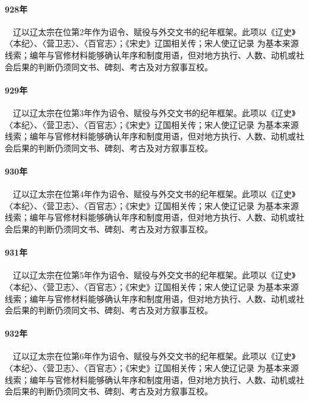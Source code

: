 \paragraph{928年}　辽以辽太宗在位第2年作为诏令、赋役与外交文书的纪年框架。此项以《辽史》〈本纪〉、〈营卫志〉、〈百官志〉；《宋史》辽国相关传；宋人使辽记录 为基本来源线索；编年与官修材料能够确认年序和制度用语，但对地方执行、人数、动机或社会后果的判断仍须同文书、碑刻、考古及对方叙事互校。

\paragraph{929年}　辽以辽太宗在位第3年作为诏令、赋役与外交文书的纪年框架。此项以《辽史》〈本纪〉、〈营卫志〉、〈百官志〉；《宋史》辽国相关传；宋人使辽记录 为基本来源线索；编年与官修材料能够确认年序和制度用语，但对地方执行、人数、动机或社会后果的判断仍须同文书、碑刻、考古及对方叙事互校。

\paragraph{930年}　辽以辽太宗在位第4年作为诏令、赋役与外交文书的纪年框架。此项以《辽史》〈本纪〉、〈营卫志〉、〈百官志〉；《宋史》辽国相关传；宋人使辽记录 为基本来源线索；编年与官修材料能够确认年序和制度用语，但对地方执行、人数、动机或社会后果的判断仍须同文书、碑刻、考古及对方叙事互校。

\paragraph{931年}　辽以辽太宗在位第5年作为诏令、赋役与外交文书的纪年框架。此项以《辽史》〈本纪〉、〈营卫志〉、〈百官志〉；《宋史》辽国相关传；宋人使辽记录 为基本来源线索；编年与官修材料能够确认年序和制度用语，但对地方执行、人数、动机或社会后果的判断仍须同文书、碑刻、考古及对方叙事互校。

\paragraph{932年}　辽以辽太宗在位第6年作为诏令、赋役与外交文书的纪年框架。此项以《辽史》〈本纪〉、〈营卫志〉、〈百官志〉；《宋史》辽国相关传；宋人使辽记录 为基本来源线索；编年与官修材料能够确认年序和制度用语，但对地方执行、人数、动机或社会后果的判断仍须同文书、碑刻、考古及对方叙事互校。

